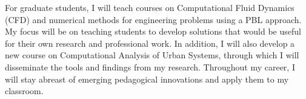 \documentclass[12pt]{article}
\begin{document}
For graduate students, I will teach courses on Computational Fluid Dynamics (CFD) and numerical methods for engineering problems using a PBL approach. My focus will be on teaching students to develop solutions that would be useful for their own research and professional work. In addition, I will also develop a new course on Computational Analysis of Urban Systems, through which I will disseminate the tools and findings from my research. Throughout my career, I will stay abreast of emerging pedagogical innovations and apply them to my classroom.
\end{document}
